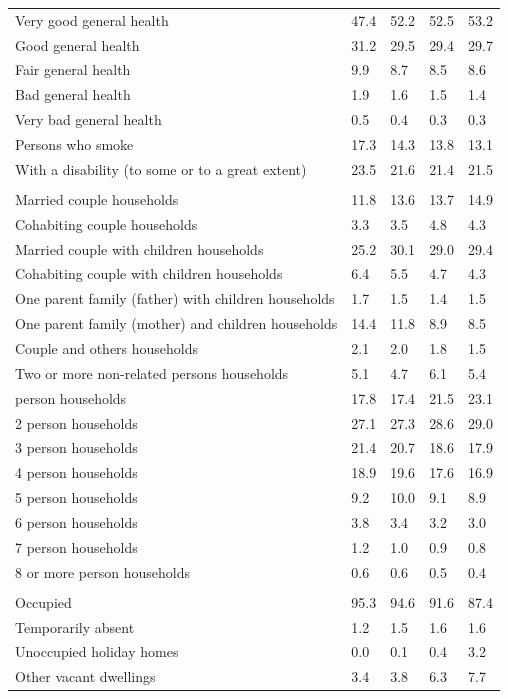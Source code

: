 \documentclass{article}
\begin{document}
\begin{table}[h]
\begin{tabular}{KTTTT}
    \hline
Very good general health & 47.4& 52.2&52.5& 53.2\\
Good general health & 31.2& 29.5& 29.4& 29.7\\
Fair general health & 9.9& 8.7&8.5& 8.6\\
Bad general health & 1.9& 1.6&1.5& 1.4\\
Very bad general health & 0.5& 0.4&0.3& 0.3\\
    \hline
Persons who smoke & 17.3& 14.3&13.8& 13.1\\
    \hline
With a disability (to some or to a great extent) & 23.5& 21.6&21.4& 21.5\\
\hline
    \\ 
    \hline
Married couple households & 11.8& 13.6& 13.7& 14.9\\
Cohabiting couple households & 3.3& 3.5& 4.8& 4.3\\
Married couple with children households & 25.2& 30.1& 29.0& 29.4\\
Cohabiting couple with children households & 6.4& 5.5& 4.7& 4.3\\
One parent family (father) with  children households & 1.7& 1.5& 1.4& 1.5\\
One parent family (mother) and children households & 14.4& 11.8&  8.9&  8.5\\
Couple and others households  & 2.1& 2.0& 1.8& 1.5\\
Two or more non-related persons households & 5.1& 4.7& 6.1& 5.4\\
     person households & 17.8& 17.4& 21.5& 23.1\\
2 person households & 27.1& 27.3& 28.6& 29.0\\
3 person households & 21.4& 20.7& 18.6& 17.9\\
4 person households & 18.9& 19.6& 17.6& 16.9\\
5 person households &  9.2& 10.0&  9.1&  8.9\\
6 person households & 3.8& 3.4& 3.2& 3.0\\
7 person households & 1.2& 1.0& 0.9& 0.8\\
8 or more person households & 0.6& 0.6& 0.5& 0.4\\
\hline
    \\ 
    \hline
Occupied & 95.3& 94.6& 91.6& 87.4\\
Temporarily absent & 1.2& 1.5& 1.6& 1.6\\
Unoccupied holiday homes & 0.0& 0.1& 0.4& 3.2\\
Other vacant dwellings & 3.4& 3.8& 6.3& 7.7\\
\hline
\end{tabular}
\end{table}
\end{document}
